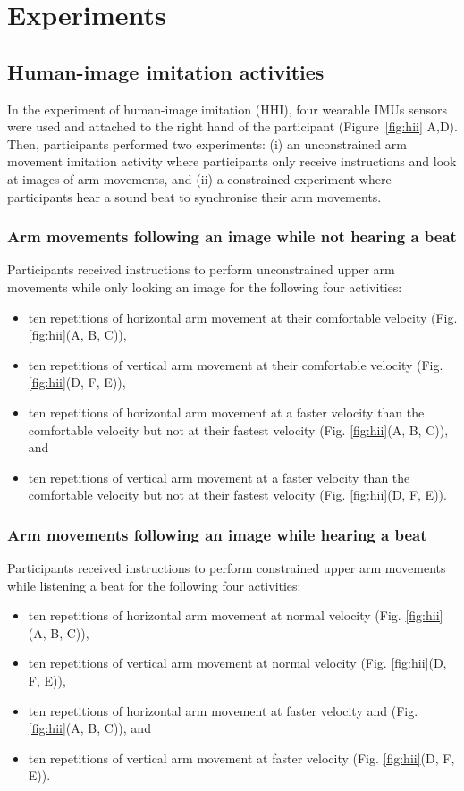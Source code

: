 \section{Experiments}
\subsection{Human-image imitation activities} \label{sec:experiment:hii}
In the experiment of human-image imitation (HHI), four wearable IMUs sensors 
were used and attached to the right hand of the participant 
(Figure~\ref{fig:hii} A,D). 
Then, participants performed two experiments: 
(i) an unconstrained arm movement imitation activity where participants 
only receive instructions and look at images of arm movements, and
(ii) a constrained experiment where participants hear a sound beat 
to synchronise their arm movements. 

\subsubsection{Arm movements following an image while not hearing a beat}
Participants received instructions to perform unconstrained upper arm 
movements while only looking an image for the following four activities:  
\begin{itemize}[noitemsep,topsep=0pt]
\item ten repetitions of horizontal arm movement at their comfortable velocity
(Fig. \ref{fig:hii}(A, B, C)), 
\item ten repetitions of vertical arm movement at their comfortable velocity 
(Fig. \ref{fig:hii}(D, F, E)),
\item ten repetitions of horizontal arm movement at a faster velocity than 
the comfortable velocity but not at their fastest velocity 
(Fig. \ref{fig:hii}(A, B, C)), and 
\item ten repetitions of vertical arm movement at a faster velocity than the 
comfortable velocity but not at their fastest velocity
(Fig. \ref{fig:hii}(D, F, E)).
\end{itemize}

\subsubsection{Arm movements following an image while hearing a beat}
Participants received instructions to perform constrained upper arm movements 
while listening a beat for the following four activities:  
\begin{itemize}[noitemsep,topsep=0pt]
\item ten repetitions of horizontal arm movement at normal velocity
(Fig. \ref{fig:hii}(A, B, C)), 
\item ten repetitions of vertical arm movement at normal velocity
(Fig. \ref{fig:hii}(D, F, E)), 
\item ten repetitions of horizontal arm movement at faster velocity and
(Fig. \ref{fig:hii}(A, B, C)), and 
\item ten repetitions of vertical arm movement at faster velocity
(Fig. \ref{fig:hii}(D, F, E)).
\end{itemize}

